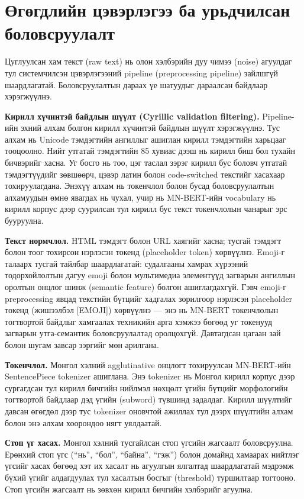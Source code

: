 \section{Өгөгдлийн цэвэрлэгээ ба урьдчилсан боловсруулалт}

Цуглуулсан хам текст (raw text) нь олон хэлбэрийн дуу чимээ (noise) агуулдаг
тул системчилсэн цэвэрлэгээний pipeline (preprocessing pipeline) зайлшгүй
шаардлагатай. Боловсруулалтын дараах үе шатуудыг дараалсан байдлаар хэрэгжүүлнэ.

\textbf{Кирилл хүчинтэй байдлын шүүлт (Cyrillic validation filtering).}
Pipeline-ийн эхний алхам болгон кирилл хүчинтэй байдлын шүүлт хэрэгжүүлнэ.
Тус алхам нь Unicode тэмдэгтийн ангиллыг ашиглан кирилл тэмдэгтийн харьцааг
тооцоолно. Нийт утгатай тэмдэгтийн 85 хувиас дээш нь кирилл биш бол тухайн
бичвэрийг хасна. Уг босго нь тоо, цэг таслал зэрэг кирилл бус боловч утгатай
тэмдэгтүүдийг зөвшөөрч, цэвэр латин болон code-switched текстийг хасахаар
тохируулагдана. Энэхүү алхам нь токенчлол болон бусад боловсруулалтын алхамуудын
өмнө явагдах нь чухал, учир нь MN-BERT-ийн vocabulary нь кирилл корпус дээр
суурилсан тул кирилл бус текст токенчлолын чанарыг эрс бууруулна.

\textbf{Текст нормчлол.} HTML тэмдэгт болон URL хаягийг хасна; тусгай тэмдэгт
болон тоог тохирсон нэрлэсэн токенд (placeholder token) хөрвүүлнэ. Emoji-г
талаарх тусгай тайлбар шаардлагатай: судалгааны хамрах хүрээний тодорхойлолтын
дагуу emoji болон мультимедиа элементүүд загварын ангиллын оролтын онцлог шинж
(semantic feature) болгон ашиглагдахгүй. Гэвч emoji-г preprocessing явцад
текстийн бүтцийг хадгалах зорилгоор нэрлэсэн placeholder токенд (жишээлбэл
{[}EMOJI{]}) хөрвүүлнэ --- энэ нь MN-BERT токенчлолын тогтвортой байдлыг
хамгаалах техникийн арга хэмжээ бөгөөд уг токенууд загварын утга-семантик
боловсруулалтад оролцохгүй. Давтагдсан цагаан зай болон шугам завсар зэргийг
мөн арилгана.

\textbf{Токенчлол.} Монгол хэлний agglutinative онцлогт тохируулсан MN-BERT-ийн
SentencePiece tokenizer ашиглана. Энэ tokenizer нь Монгол кирилл корпус дээр
сургагдсан тул кирилл бичгийн нийлмэл нөхцөлт үгийн бүтцийг морфологийн
тогтвортой байдлаар дэд үгийн (subword) түвшинд задалдаг. Кирилл шүүлтийг давсан
өгөгдөл дээр тус tokenizer оновчтой ажиллах тул дээрх шүүлтийн алхам болон энэ
алхам хоорондоо нягт уялдаатай.

\textbf{Стоп үг хасах.} Монгол хэлний тусгайлсан стоп үгсийн жагсаалт
боловсруулна. Ерөнхий стоп үгс (``нь'', ``бол'', ``байна'', ``гэж'') болон
домайнд хамаарах нийтлэг үгсийг хасах бөгөөд хэт их хасалт нь агуулгын ялгалтад
шаардлагатай мэдрэмж бүхий үгийг алдагдуулах тул хасалтын босгыг (threshold)
туршилтаар тогтооно. Стоп үгсийн жагсаалт нь зөвхөн кирилл бичгийн хэлбэрийг
агуулна.

